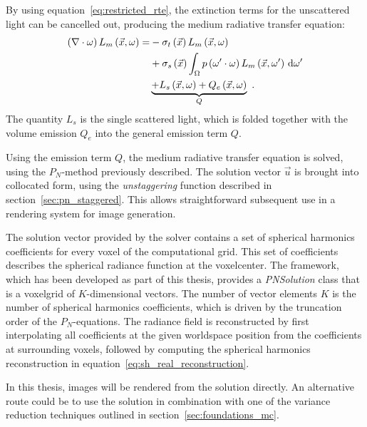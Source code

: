 By using equation~\ref{eq:restricted_rte}, the extinction terms for the unscattered light can be cancelled out, producing the medium radiative transfer equation:
\begin{align}
\left(\nabla\cdot\omega\right)L_m\left(\vec{x}, \omega \right)
=&
-\sigma_t\left(\vec{x}\right) L_m\left(\vec{x}, \omega \right)\nonumber\\
&
+\sigma_s\left(\vec{x}\right) \int_{\Omega}
{
p\left(\omega'\cdot\omega\right)L_m\left(\vec{x}, \omega' \right)\,\mathrm{d}\omega'
}
\nonumber
\\
&
\underbrace
{
+L_s\left(\vec{x}, \omega\right)
+Q_e\left(\vec{x}, \omega\right)
}_{Q}
\nonumber
\  .
\end{align}
The quantity $L_s$ is the single scattered light, which is folded together with the volume emission $Q_e$ into the general emission term $Q$.

Using the emission term $Q$, the medium radiative transfer equation is solved, using the $P_N$-method previously described. The solution vector $\vec{u}$ is brought into collocated form, using the \emph{unstaggering} function described in section~\ref{sec:pn_staggered}. This allows straightforward subsequent use in a rendering system for image generation. 

The solution vector provided by the solver contains a set of spherical harmonics coefficients for every voxel of the computational grid. This set of coefficients describes the spherical radiance function at the voxelcenter. The framework, which has been developed as part of this thesis, provides a \emph{PNSolution} class that is a voxelgrid of $K$-dimensional vectors. The number of vector elements $K$ is the number of spherical harmonics coefficients, which is driven by the truncation order of the $P_N$-equations. The radiance field is reconstructed by first interpolating all coefficients at the given worldspace position from the coefficients at surrounding voxels, followed by computing the spherical harmonics reconstruction in equation~\ref{eq:sh_real_reconstruction}.

In this thesis, images will be rendered from the solution directly. An alternative route could be to use the solution in combination with one of the variance reduction techniques outlined in section~\ref{sec:foundations_mc}.

